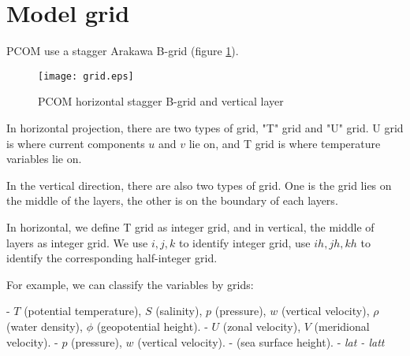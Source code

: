 \section{Model grid}

PCOM use a stagger Arakawa B-grid (figure \ref{fig:grid}).

\begin{figure}[h!]
\centering
\texttt{[image: grid.eps]}
\caption{PCOM horizontal stagger B-grid and vertical layer} \label{fig:grid}
\end{figure}

In horizontal projection, there are two types of grid, "T" grid and "U" grid.
U grid is where current components $u$ and $v$ lie on, and T grid is where 
temperature variables lie on.

In the vertical direction, there are also two types of grid. One is the grid
lies on the middle of the layers, the other is on the boundary of each layers.

In horizontal, we define T grid as integer grid, and in vertical, the middle of
layers as integer grid. We use $i,j,k$ to identify integer grid, use $ih, jh,
kh$ to identify the corresponding half-integer grid.

For example, we can classify the variables by grids:

\bd

 - $T$ (potential temperature), $S$ (salinity), 
$p$ (pressure), $w$ (vertical velocity), $\rho$ (water density), $\phi$
(geopotential height).
 - $U$ (zonal velocity), $V$ (meridional velocity).
 - $p$ (pressure), $w$ (vertical velocity).
 -  (sea surface height). 
 -  \em{lat}
 -  \em{latt}

\ed


